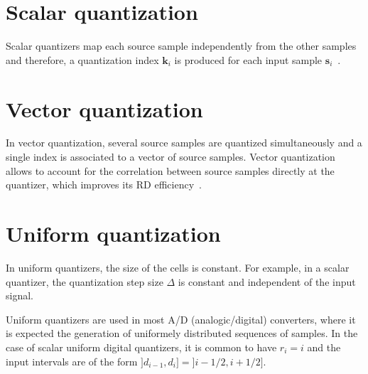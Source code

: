 \section{Scalar quantization}

Scalar quantizers map each source sample independently from the other
samples and therefore, a quantization index ${\mathbf k}_i$ is
produced for each input sample ${\mathbf
  s}_i$~\cite{vruiz__scalar_quantization}.

\section{Vector quantization}

In vector quantization, several source samples are quantized
simultaneously and a single index is associated to a vector of source
samples. Vector quantization allows to account for the correlation
between source samples directly at the quantizer, which improves its
RD efficiency~\cite{duhamel2009joint, vruiz__vector_quantization}.

\section{Uniform quantization}

In uniform quantizers, the size of the cells is constant. For example,
in a scalar quantizer, the quantization step size $\Delta$ is constant
and independent of the input signal.

Uniform quantizers are used in most A/D (analogic/digital) converters,
where it is expected the generation of uniformely distributed
sequences of samples. In the case of scalar uniform digital
quantizers, it is common to have $r_i=i$ and the input intervals are
of the form $]d_{i-1},d_i]=]i-1/2,i+1/2]$.

